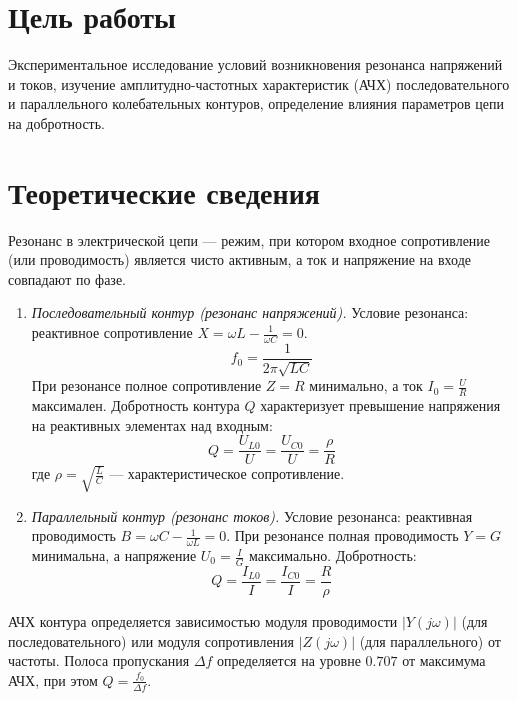 \section*{Цель работы}
Экспериментальное исследование условий возникновения резонанса напряжений и токов, изучение амплитудно-частотных характеристик (АЧХ) последовательного и параллельного колебательных контуров, определение влияния параметров цепи на добротность.

\section*{Теоретические сведения}
Резонанс в электрической цепи — режим, при котором входное сопротивление (или проводимость) является чисто активным, а ток и напряжение на входе совпадают по фазе.

\begin{enumerate}
    \item \textit{Последовательный контур (резонанс напряжений).} Условие резонанса: реактивное сопротивление $X = \omega L - \frac{1}{\omega C} = 0$.
    \begin{equation}
        f_0 = \frac{1}{2\pi\sqrt{LC}}
    \end{equation}
    При резонансе полное сопротивление $Z = R$ минимально, а ток $I_0 = \frac{U}{R}$ максимален. Добротность контура $Q$ характеризует превышение напряжения на реактивных элементах над входным:
    \begin{equation}
        Q = \frac{U_{L0}}{U} = \frac{U_{C0}}{U} = \frac{\rho}{R}
    \end{equation}
    где $\rho = \sqrt{\frac{L}{C}}$ — характеристическое сопротивление.

    \item \textit{Параллельный контур (резонанс токов).} Условие резонанса: реактивная проводимость $B = \omega C - \frac{1}{\omega L} = 0$. При резонансе полная проводимость $Y = G$ минимальна, а напряжение $U_0 = \frac{I}{G}$ максимально. Добротность:
    \begin{equation}
        Q = \frac{I_{L0}}{I} = \frac{I_{C0}}{I} = \frac{R}{\rho}
    \end{equation}
\end{enumerate}

АЧХ контура определяется зависимостью модуля проводимости $|Y(j\omega)|$ (для последовательного) или модуля сопротивления $|Z(j\omega)|$ (для параллельного) от частоты. Полоса пропускания $\Delta f$ определяется на уровне $0.707$ от максимума АЧХ, при этом $Q = \frac{f_0}{\Delta f}$.

